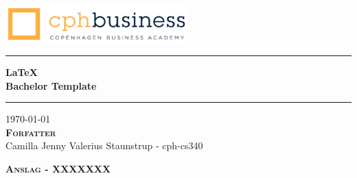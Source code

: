 
\begin{titlepage}
\begin{center}

\vspace*{4cm}
\includegraphics[width=7cm]{./figures/cphlogo.png}
\vspace*{2cm}

\hrule
\vspace{.5cm}
{ \huge \bfseries \LaTeX\\Bachelor Template} 
\vspace{.5cm}
\hrule

\vspace{1cm}
\centering \today\\
\vspace{0.5cm}
\textsc{\textbf{Forfatter}}\\

\centering
Camilla Jenny Valerius Staunstrup - cph-cs340

\vspace{10cm}
\textsc{\textbf{Anslag - XXXXXXX}}\\

\end{center}
\end{titlepage}